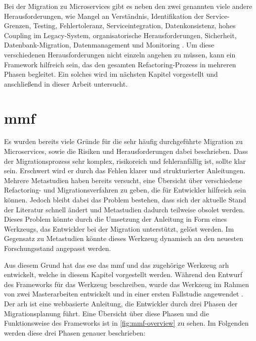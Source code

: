 Bei der Migration zu Microservices gibt es neben den zwei genannten viele andere Her\-aus\-for\-de\-run\-gen, wie Mangel an Verständnis, Identifikation der Service-Grenzen, Testing, Fehlertoleranz, Serviceintegration, Datenkonsistenz, hohes Coupling im Legacy-System, organisatorische Her\-aus\-for\-de\-run\-gen, Sicherheit, Datenbank-Migration, Datenmanagement und Monitoring \cite{migration-challanges2023}.
Um diese verschiedenen Her\-aus\-for\-de\-run\-gen nicht einzeln angehen zu müssen, kann ein Framework hilfreich sein, das den gesamten Refactoring-Prozess in mehreren Phasen begleitet.
Ein solches wird im nächsten Kapitel vorgestellt und anschließend in dieser Arbeit untersucht.

\section{\acrfull{mmf}}
\label{sec:mmf}

Es wurden bereits viele Gründe für die sehr häufig durchgeführte Migration zu Microservices, sowie die Risiken und Herausforderungen dabei beschrieben.
Dass der Migrationsprozess sehr komplex, risikoreich und fehleranfällig ist, sollte klar sein.
Erschwert wird er durch das Fehlen klarer und strukturierter Anleitungen.
Mehrere Metastudien haben bereits versucht, eine Übersicht über verschiedene Refactoring- und Migrationsverfahren zu geben, die für Entwickler hilfreich sein können.
Jedoch bleibt dabei das Problem bestehen, dass sich der aktuelle Stand der Literatur schnell ändert und Metastudien dadurch teilweise obsolet werden.
Dieses Problem könnte durch die Umsetzung der Anleitung in Form eines Werkzeugs, das Entwickler bei der Migration unterstützt, gelöst werden.
Im Gegensatz zu Metastudien könnte dieses Werkzeug dynamisch an den neuesten Forschungsstand angepasst werden.

Aus diesem Grund hat das \gls{ese} das \acrfull{mmf} und das zugehörige Werkzeug \gls{arh} \cite{arh-github} entwickelt, welche in diesem Kapitel vorgestellt werden.
Während  den Entwurf des Frameworks für das Werkzeug beschreiben, wurde das Werkzeug im Rahmen von zwei Masterarbeiten entwickelt \cite{master-daniel-koch,master-tobias-haller} und in einer ersten Fallstudie angewendet \cite{master-marvin-knodel}.
Der \gls{arh} ist eine webbasierte Anleitung, die Entwickler durch drei Phasen der Migrationsplanung führt.
Eine Übersicht über diese Phasen und die Funktionsweise des Frameworks ist in \cref{fig:mmf-overview} zu sehen.
Im Folgenden werden diese drei Phasen genauer beschrieben:

